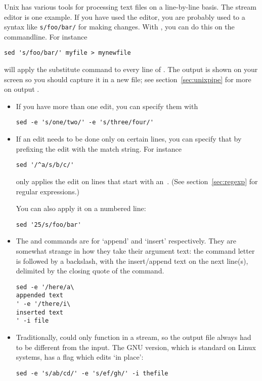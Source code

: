 Unix has various tools for processing text files on a line-by-line
basis.
The stream editor  is one example. If you have used the
 editor, you are probably used to a syntax like
\verb+s/foo/bar/+ for making changes.
With , you can do this on the commandline.
For instance
\begin{verbatim}
sed 's/foo/bar/' myfile > mynewfile
\end{verbatim}
will apply the substitute command  to every line of
. The output is shown on your screen so you should capture
it in a new file; see section~\ref{sec:unixpipe} for more on output
.

\begin{itemize}
\item If you have more than one edit, you can specify them with
\begin{verbatim}
sed -e 's/one/two/' -e 's/three/four/'
\end{verbatim}
\item If an edit needs to be done only on certain lines, you can
  specify that by prefixing the edit with the match string. For instance
\begin{verbatim}
sed '/^a/s/b/c/'
\end{verbatim}
only applies the edit on lines that start with an~. (See
section~\ref{sec:regexp} for regular expressions.)

You can also apply it on a numbered line:
\begin{verbatim}
sed '25/s/foo/bar'
\end{verbatim}
\item The  and  commands are for `append' and `insert' respectively.
  They are somewhat strange in how they take their argument text:
  the command letter is followed by a backslash, with the insert/append
  text on the next line(s), delimited by the closing quote of the command.
\begin{verbatim}
sed -e '/here/a\
appended text
' -e '/there/i\
inserted text
' -i file
\end{verbatim}
\item Traditionally,  could only function in a stream, so
  the output file always had to be different from the input. The GNU
  version, which is standard on Linux systems, has a flag \n{-i} which
  edits `in place':
\begin{verbatim}
sed -e 's/ab/cd/' -e 's/ef/gh/' -i thefile
\end{verbatim}
\end{itemize}

